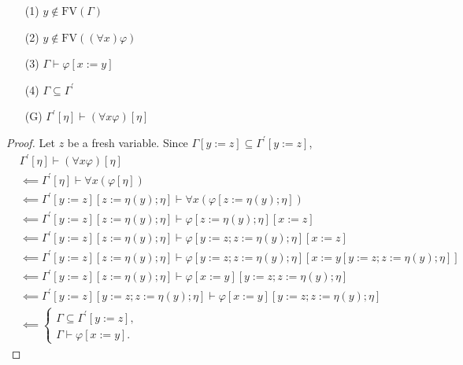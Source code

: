 \documentclass[12pt]{paper}
\begin{document}
\begin{enumerate}
\item [(1)] $y \notin \mathrm{FV} \left( \Gamma \right)$
\item [(2)] $y \notin \mathrm{FV} \left( \left( \forall x \right) \varphi \right)$
\item [(3)] $\Gamma \vdash \varphi \left[ x := y \right]$
\item [(4)] $\Gamma \subseteq \Gamma^{\prime}$
\item [(G)] $\Gamma^{\prime} \left[ \eta \right] \vdash \left( \forall x \varphi \right) \left[ \eta \right]$
\end{enumerate}
\begin{proof} Let $z$ be a fresh variable. Since $\Gamma \left[ y := z \right] \subseteq \Gamma^{\prime} \left[ y := z \right]$,
\begin{align*}
& \Gamma^{\prime} \left[ \eta \right] \vdash \left( \forall x \varphi \right) \left[ \eta \right] \\
& \impliedby \Gamma^{\prime} \left[ \eta \right] \vdash \forall x \left( \varphi \left[ \eta \right] \right) \\
& \impliedby \Gamma^{\prime} \left[ y := z \right] \left[ z := \eta \left( y \right) ; \eta \right] \vdash \forall x \left( \varphi \left[ z := \eta \left( y \right) ; \eta \right] \right) \\
& \impliedby \Gamma^{\prime} \left[ y := z \right] \left[ z := \eta \left( y \right) ; \eta \right] \vdash \varphi \left[ z := \eta \left( y \right) ; \eta \right] \left[ x := z \right] \\
& \impliedby \Gamma^{\prime} \left[ y := z \right] \left[ z := \eta \left( y \right) ; \eta \right] \vdash \varphi \left[ y := z ; z := \eta \left( y \right) ; \eta \right] \left[ x := z \right] \\
& \impliedby \Gamma^{\prime} \left[ y := z \right] \left[ z := \eta \left( y \right) ; \eta \right] \vdash \varphi \left[ y := z ; z := \eta \left( y \right) ; \eta \right] \left[ x := y \left[ y := z ; z := \eta \left( y \right) ; \eta \right] \right] \\
& \impliedby \Gamma^{\prime} \left[ y := z \right] \left[ z := \eta \left( y \right) ; \eta \right] \vdash \varphi \left[ x := y \right] \left[ y := z ; z := \eta \left( y \right) ; \eta \right] \\
& \impliedby \Gamma^{\prime} \left[ y := z \right] \left[ y := z ; z := \eta \left( y \right) ; \eta \right] \vdash \varphi \left[ x := y \right] \left[ y := z ; z := \eta \left( y \right) ; \eta \right] \\
& \impliedby
\begin{cases}
\Gamma \subseteq \Gamma^{\prime} \left[ y := z \right] , \\
\Gamma \vdash \varphi \left[ x := y \right] .
\end{cases}
\end{align*}
\end{proof}
\end{document}
